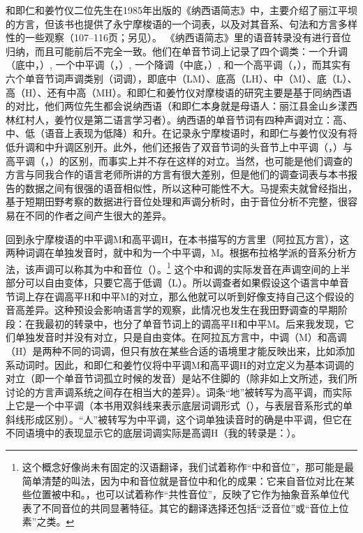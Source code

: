 和即仁和姜竹仪二位先生在1985年出版的《纳西语简志》中，主要介绍了丽江平坝的{方言}，但该书也提供了永宁摩梭语的一个词表，以及对其音系、句法和{方言}多样性的一些观察（107–116页；另见\textcite{jiang1993}）。
《{纳西}语简志》里的语音转录没有进行音位归纳，而且可能前后不完全一致。他们在{单音节词}上记录了四个调类：一个升调（底中，）, 一个中{平调}（，）, 一个降调（中底，）, 和一个高{平调}（，），而其实有六个{单音节词}声调类别（词调），即底中（LM）、底高（LH）、中（M）、底（L）、高（H）、还有中高（MH）\parencite{michaud2017}。和即仁和姜竹仪对摩梭语的研究主要是基于同{纳西}语的对比，他们两位先生都会说{纳西}语（和即仁本身就是母语人：丽江县金山乡漾西林红村人，姜竹仪是第二语言学习者）。纳西语的{单音节词}有四种声调对立：高、中、低（语音上表现为低降）和升。在记录永宁摩梭语时，和即仁与姜竹仪没有将低升调和中升调区别开。此外，他们还报告了双音节词的头音节上中{平调}（，）与高{平调}（，）的区别，而事实上并不{存在}这样的对立。当然，也可能是他们调查的{方言}与同我合作的语言老师所讲的{方言}有很大差别，但是他们的调查词表与本书报告的数据之间有很强的语音相似性，所以这种可能性不大。马提索夫就曾经指出，基于短期田野考察的数据进行音位处理和声调分析时，由于音位分析不完整，很容易在不同的作者之间产生很大的差异\parencite[329]{matisoff2004}。

回到永宁摩梭语的中{平调}M和高{平调}H，在本书描写的{方言}里（阿拉瓦{方言}），这两种词调在{{单独}}发音时，就中和为一个中{平调}，M。根据{布拉格}学派的音系分析方法，该声调可以称其为{中和}音位（）。\footnote{{}这个概念好像尚未有固定的汉语翻译，我们试着称作“{中和}音位”，那可能是最简单清楚的叫法，因为中和音位就是音位中和化的成果：它来自音位对比在某些位置被中和。，也可以试着称作“共性音位”，反映了它作为抽象音系单位代表了不同音位的共同显著特征。其它的翻译选择还包括“泛音位”或“音位上位素”之类。}
这个中和调的实际发音在声调空间的上半部分可以{自由变体}，只要它高于低调（L）。所以调查者如果假设这个语言中{单音节词}上{存在}调高平H和中平M的对立，那么他就可以听到好像支持自己这个假设的音高差异。这种预设会影响语言学的观察，此情况也发生在我田野调查的早期阶段：在我最初的转录中，也分了{单音节词}上的调高平H和中平M。后来我发现，它们{单独}发音时并没有对立，只是自由变体。在阿拉瓦{方言}中，中调（M）和高调（H）是两种不同的词调，但只有放在某些合适的语境里才能反映出来，比如添加系动词时。因此，和即仁和姜竹仪将中{平调}M和高{平调}H的对立定义为基本词调的对立（即一个{单音节词}孤立时候的发音）是站不住脚的（除非如上文所述，我们所讨论的{方言}声调系统之间{存在}相当大的差异）。词条“地”被转写为高{平调}，而实际上它是一个中{平调}（本书用双斜线来表示底层词调形式（），与表层音系形式的单斜线形成区别）。“人”被转写为中{平调}，这个词{单独}读音时的确是中{平调}，但它在不同语境中的表现显示它的底层词调实际是高调H（我的转录是：）。

